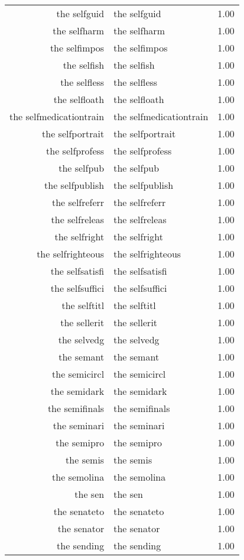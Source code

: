 \begin{table}[ht]
\begin{tabular}{rlr}
  the selfguid & the selfguid & 1.00 \\ 
  the selfharm & the selfharm & 1.00 \\ 
  the selfimpos & the selfimpos & 1.00 \\ 
  the selfish & the selfish & 1.00 \\ 
  the selfless & the selfless & 1.00 \\ 
  the selfloath & the selfloath & 1.00 \\ 
  the selfmedicationtrain & the selfmedicationtrain & 1.00 \\ 
  the selfportrait & the selfportrait & 1.00 \\ 
  the selfprofess & the selfprofess & 1.00 \\ 
  the selfpub & the selfpub & 1.00 \\ 
  the selfpublish & the selfpublish & 1.00 \\ 
  the selfreferr & the selfreferr & 1.00 \\ 
  the selfreleas & the selfreleas & 1.00 \\ 
  the selfright & the selfright & 1.00 \\ 
  the selfrighteous & the selfrighteous & 1.00 \\ 
  the selfsatisfi & the selfsatisfi & 1.00 \\ 
  the selfsuffici & the selfsuffici & 1.00 \\ 
  the selftitl & the selftitl & 1.00 \\ 
  the sellerit & the sellerit & 1.00 \\ 
  the selvedg & the selvedg & 1.00 \\ 
  the semant & the semant & 1.00 \\ 
  the semicircl & the semicircl & 1.00 \\ 
  the semidark & the semidark & 1.00 \\ 
  the semifinals & the semifinals & 1.00 \\ 
  the seminari & the seminari & 1.00 \\ 
  the semipro & the semipro & 1.00 \\ 
  the semis & the semis & 1.00 \\ 
  the semolina & the semolina & 1.00 \\ 
  the sen & the sen & 1.00 \\ 
  the senateto & the senateto & 1.00 \\ 
  the senator & the senator & 1.00 \\ 
  the sending & the sending & 1.00 \\ 

\end{tabular}
\end{table}
